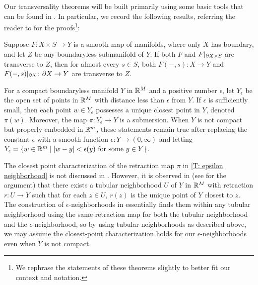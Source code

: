 Our transversality theorems will be built primarily using some basic tools that can be found in \cite[Section 2.3]{GuPo74}.
In particular, we record the following results, referring the reader to \cite[Section 2.3]{GuPo74} for the proofs\footnote{We rephrase the statements of these theorems slightly to better fit our context and notation.}:

\begin{theorem}\label{T: GP transversality}
	Suppose $F \colon X \times S \to Y$ is a smooth map of manifolds, where only $X$ has boundary, and let $Z$ be any boundaryless submanifold of $Y$.
	If both $F$ and $F|_{\partial X \times S}$ are transverse to $Z$, then for almost every $s \in S$, both $F(-,s) \colon X \to Y$ and $F(-,s)|_{\partial X} \colon \partial X \to Y$ are transverse to $Z$.
\end{theorem}

\begin{theorem}\label{T: epsilon neighborhood}
	For a compact boundaryless manifold $Y$ in $\mathbb{R}^M$ and a positive number $\epsilon$, let $Y_\epsilon$ be the open set of points in $\mathbb{R}^M$ with distance less than $\epsilon$ from $Y$.
	If $\epsilon$ is sufficiently small, then each point $w \in Y_\epsilon$ possesses a unique closest point in $Y$, denoted $\pi(w)$.
	Moreover, the map $\pi \colon Y_\epsilon \to Y$ is a submersion.
	When $Y$ is not compact but properly embedded in $\mathbb{R}^m$, these statements remain true after replacing the constant $\epsilon$ with a smooth function $\epsilon \colon Y \to (0, \infty)$ and letting $Y_\epsilon = \{w \in \mathbb{R}^m \mid |w-y|<\epsilon(y) \text{\ for some\ } y \in Y\}$.
\end{theorem}

\begin{remark}
	The closest point characterization of the retraction map $\pi$ in \cref{T: epsilon neighborhood} is not discussed in \cite{GuPo74}.
	However, it is observed in \cite[Problem 6-5]{Lee13} (see \cite{KK24} for the argument) that there exists a tubular neighborhood $U$ of $Y$ in $\mathbb{R}^M$ with retraction $r \colon U \to Y$ such that for each $z \in U$, $r(z)$ is the unique point of $Y$ closest to $z$.
	The construction of $\epsilon$-neighborhoods in \cite{GuPo74} essentially finds them within any tubular neighborhood using the same retraction map for both the tubular neighborhood and the $\epsilon$-neighborhood, so by using tubular neighborhoods as described above, we may assume the closest-point characterization holds for our $\epsilon$-neighborhoods even when $Y$ is not compact.
\end{remark}

